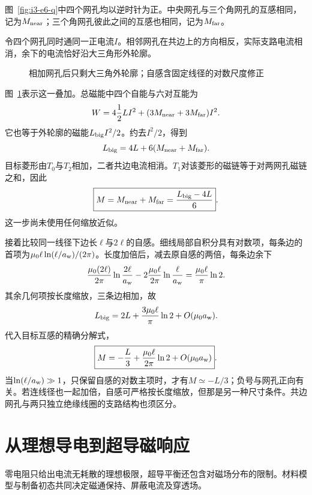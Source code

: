 \begin{solution}
图~\ref{fig:i3-e6-q}中四个网孔均以逆时针为正。中央网孔与三个角网孔的互感相同，记为$M_{\rm near}$；三个角网孔彼此之间的互感也相同，记为$M_{\rm far}$。

令四个网孔同时通同一正电流$I$。相邻网孔在共边上的方向相反，实际支路电流相消，余下的电流恰好沿大三角形外轮廓。
\begin{figure}[H]\centering
{}
\caption{相加网孔后只剩大三角外轮廓；自感含固定线径的对数尺度修正}\label{fig:i3-e6-s}
\end{figure}
图~\ref{fig:i3-e6-s}表示这一叠加。总磁能中四个自能与六对互能为
\[
W=4\frac12LI^2+
(3M_{\rm near}+3M_{\rm far})I^2.
\]
它也等于外轮廓的磁能$L_{\rm big}I^2/2$。约去$I^2/2$，得到
\[
L_{\rm big}=4L+6(M_{\rm near}+M_{\rm far}).
\]
目标菱形由$T_0$与$T_2$相加，二者共边电流相消。$T_1$对该菱形的磁链等于对两网孔磁链之和，因此
\[
\boxed{M=M_{\rm near}+M_{\rm far}
=\frac{L_{\rm big}-4L}{6}}.
\]
这一步尚未使用任何缩放近似。

接着比较同一线径下边长$\ell$与$2\ell$的自感。细线局部自积分具有对数项，每条边的首项为$\mu_0\ell\ln(\ell/a_{\rm w})/(2\pi)$。长度加倍后，减去原自感的两倍，每条边余下
\[
\frac{\mu_0(2\ell)}{2\pi}\ln\frac{2\ell}{a_{\rm w}}
-2\frac{\mu_0\ell}{2\pi}\ln\frac{\ell}{a_{\rm w}}
=\frac{\mu_0\ell}{\pi}\ln2.
\]
其余几何项按长度缩放，三条边相加，故
\[
L_{\rm big}=2L+\frac{3\mu_0\ell}{\pi}\ln2
+O(\mu_0a_{\rm w}).
\]
代入目标互感的精确分解式，
\[
\boxed{M=-\frac L3+\frac{\mu_0\ell}{2\pi}\ln2
+O(\mu_0a_{\rm w})}.
\]
当$\ln(\ell/a_{\rm w})\gg1$，只保留自感的对数主项时，才有$M\simeq-L/3$；负号与网孔正向有关。若连线径也一起加倍，自感可严格按长度缩放，但那是另一种尺寸条件。共边网孔与两只独立绝缘线圈的支路结构也须区分。
\end{solution}


\section{从理想导电到超导磁响应}\label{sec:i3-london}
零电阻只给出电流无耗散的理想极限，超导平衡还包含对磁场分布的限制。材料模型与制备初态共同决定磁通保持、屏蔽电流及穿透场。

